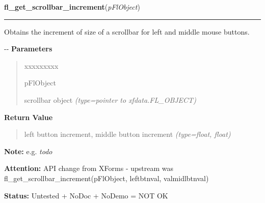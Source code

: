 \hspace{.8\funcindent}\begin{boxedminipage}{\funcwidth}

    \raggedright \textbf{fl\_get\_scrollbar\_increment}(\textit{pFlObject})

    \vspace{-1.5ex}

    \rule{\textwidth}{0.5\fboxrule}
\setlength{\parskip}{2ex}

Obtains the increment of size of a scrollbar for left and middle mouse
buttons.

-{}-
\setlength{\parskip}{1ex}
      \textbf{Parameters}
      \vspace{-1ex}

      \begin{quote}
        \begin{Ventry}{xxxxxxxxx}

          \item[pFlObject]


scrollbar object
            {\it (type=pointer to xfdata.FL\_OBJECT)}

        \end{Ventry}

      \end{quote}

      \textbf{Return Value}
    \vspace{-1ex}

      \begin{quote}

left button increment, middle button increment
      {\it (type=float, float)}

      \end{quote}

\textbf{Note:} 
e.g. \emph{todo}


\textbf{Attention:} 
API change from XForms - upstream was
fl\_get\_scrollbar\_increment(pFlObject, leftbtnval, valmidlbtnval)


\textbf{Status:} 
Untested + NoDoc + NoDemo = NOT OK


    \end{boxedminipage}

    \label{xformslib:flscrollbar:fl_set_scrollbar_bounds}

    \vspace{0.5ex}

